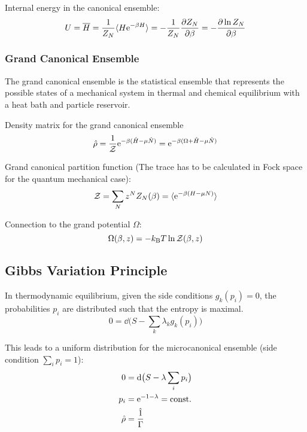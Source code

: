 			\noindent
			Internal energy in the canonical ensemble:
			\begin{equation}
				U = \overline{H} = \frac{1}{Z_N}\langle H\mathrm{e}^{-\beta H}\rangle = -\frac{1}{Z_N}\pdv{Z_N}{\beta} = -\pdv{\ln Z_N}{\beta}
			\end{equation}

		\subsubsection{Grand Canonical Ensemble}
			The grand canonical ensemble is the statistical ensemble that represents the possible states of a mechanical system in thermal and chemical equilibrium with a heat bath and particle reservoir.

			Density matrix for the grand canonical ensemble
			\begin{equation}
				\hat{\rho} = \frac{1}{\mathcal{Z}} \mathrm{e}^{-\beta (\hat{H} - \mu \hat{N})}
				= \mathrm{e}^{-\beta (\Omega + \hat{H} - \mu \hat{N})}
			\end{equation}

			\noindent
			Grand canonical partition function (The trace has to be calculated in Fock space for the quantum mechanical case):
			\begin{equation}
				\mathcal{Z} = \sum_N z^N Z_N(\beta) = \langle \mathrm{e}^{-\beta(H-\mu N)} \rangle
			\end{equation}

			\noindent
			Connection to the grand potential $\Omega$:
			\begin{equation}
				\Omega(\beta,z) = -k_{\text{B}} T \ln \mathcal{Z}(\beta,z)
			\end{equation}


		\subsection{Gibbs Variation Principle}
			\noindent
			In thermodynamic equilibrium, given the side conditions $g_k(p_i) = 0$, the probabilities $p_i$ are distributed such that the entropy is maximal.
			\begin{equation}
				0 = \dd \big( S - \sum_k \lambda_k g_k(p_i) \big)
			\end{equation}

			\noindent
			This leads to a uniform distribution for the microcanonical ensemble (side condition $\sum_i p_i = 1$):
			\begin{equation}
				\begin{aligned}
					0 &= \dd \big( S - \lambda \sum_i p_i \big) \\
					p_i &= \mathrm{e}^{-1-\lambda} = \mathrm{const.} \\
					\hat{\rho} &= \frac{\hat{1}}{\Gamma} \\
				\end{aligned}
			\end{equation}

